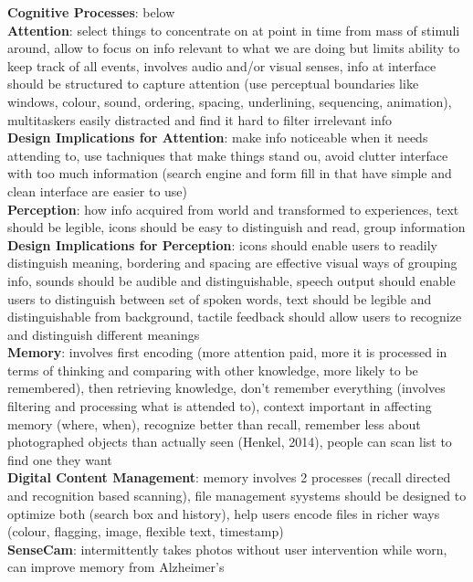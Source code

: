\documentclass[a4paper]{article}
\begin{document}
\begin{multicols}{2}
        \textbf{Cognitive Processes}: below\\
        \textbf{Attention}: select things to concentrate on at point in time from mass of stimuli around, allow to focus on info relevant to what we are doing but limits ability to keep track of all events, involves audio and/or visual senses, info at interface should be structured to capture attention (use perceptual boundaries like windows, colour, sound, ordering, spacing, underlining, sequencing, animation), multitaskers easily distracted and find it hard to filter irrelevant info\\
        \textbf{Design Implications for Attention}: make info noticeable when it needs attending to, use tachniques that make things stand ou, avoid clutter interface with too much information (search engine and form fill in that have simple and clean interface are easier to use)\\
        \textbf{Perception}: how info acquired from world and transformed to experiences, text should be legible, icons should be easy to distinguish and read, group information\\
        \textbf{Design Implications for Perception}: icons should enable users to readily distinguish meaning, bordering and spacing are effective visual ways of grouping info, sounds should be audible and distinguishable, speech output should enable users to distinguish between set of spoken words, text should be legible and distinguishable from background, tactile feedback should allow users to recognize and distinguish different meanings\\
        \textbf{Memory}: involves first encoding (more attention paid, more it is processed in terms of thinking and comparing with other knowledge, more likely to be remembered), then retrieving knowledge, don't remember everything (involves filtering and processing what is attended to), context important in affecting memory (where, when), recognize better than recall, remember less about photographed objects than actually seen (Henkel, 2014), people can scan list to find one they want\\
        \textbf{Digital Content Management}: memory involves 2 processes (recall directed and recognition based scanning), file management syystems should be designed to optimize both (search box and history), help users encode files in richer ways (colour, flagging, image, flexible text, timestamp)\\
        \textbf{SenseCam}: intermittently takes photos without user intervention while worn, can improve memory from Alzheimer's\\

\end{multicols}
\end{document}
